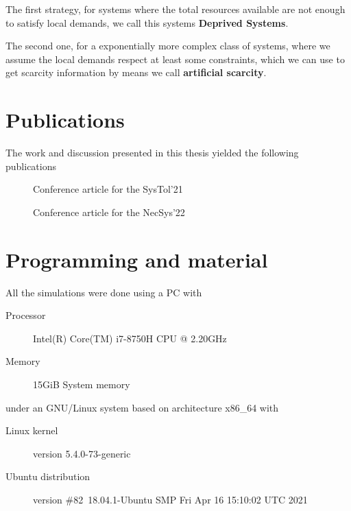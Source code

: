 \documentclass[../main.tex]{subfiles}
\begin{document}
The first strategy, for systems where the total resources available are not enough to satisfy local demands, we call this systems \textbf{Deprived Systems}.

The second one, for a exponentially more complex class of systems, where we assume the local demands respect at least some constraints, which we can use to get scarcity information by means we call \textbf{artificial scarcity}.


\section{Publications}
The work and discussion presented in this thesis yielded the following publications
\begin{description}
  \item[\cite{NogueiraEtAl2021}] Conference article for the SysTol'21
  \item[\cite{NogueiraEtAl2022}] Conference article for the NecSys'22
\end{description}

\section{Programming and material}
All the simulations were done using a PC with
\begin{description}
\item [Processor] Intel(R) Core(TM) i7-8750H CPU @ 2.20GHz
\item [Memory] 15GiB System memory
\end{description}
under an GNU/Linux system based on architecture x86\_64 with
\begin{description}
    \item[Linux kernel] version 5.4.0-73-generic
    \item[Ubuntu distribution] version \#82~18.04.1-Ubuntu SMP Fri Apr 16 15:10:02 UTC 2021
\end{description}
\end{document}
